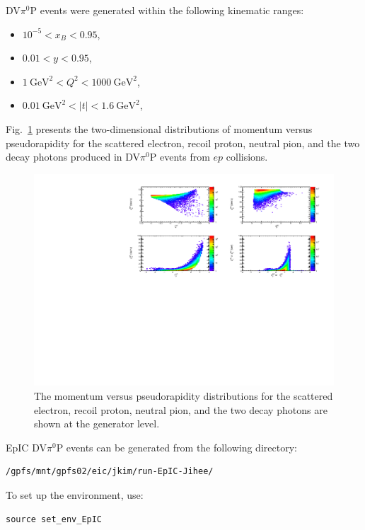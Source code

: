 \documentclass[letterpaper,12pt]{article}
\begin{document}
DV$\pi^{0}$P events were generated within the following kinematic ranges:

\begin{itemize}
\item $10^{-5} < x_{B} < 0.95$,
\item $0.01 < y < 0.95$,
\item $1~\text{GeV}^2 < Q^{2} < 1000~\text{GeV}^2$,
\item $0.01~\text{GeV}^2 < |t| < 1.6~\text{GeV}^2$,
\end{itemize}

Fig.~\ref{fig:mcparticle2d} presents the two-dimensional distributions of momentum versus pseudorapidity for the scattered electron, recoil proton, neutral pion, and the two decay photons produced in DV$\pi^{0}$P events from $ep$ collisions.

\begin{figure}[ht]
    \centering
    \includegraphics[width=\textwidth]{Figures/MCparticles2D.pdf}
    \caption{The momentum versus pseudorapidity distributions for the scattered electron, recoil proton, neutral pion, and the two decay photons are shown at the generator level.}
\label{fig:mcparticle2d}
\end{figure}

\pagebreak
EpIC DV$\pi^0$P events can be generated from the following directory:
\begin{verbatim}
/gpfs/mnt/gpfs02/eic/jkim/run-EpIC-Jihee/
\end{verbatim}

To set up the environment, use:
\begin{verbatim}
source set_env_EpIC
\end{verbatim}
\end{document}
